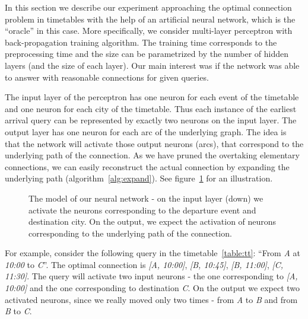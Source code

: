 In this section we describe our experiment approaching the optimal connection problem in timetables with the help of an artificial neural network, which is the ``oracle'' in this case. More specifically, we consider multi-layer perceptron with back-propagation training algorithm. The training time corresponds to the preprocessing time and the size can be parametrized by the number of hidden layers (and the size of each layer). Our main interest was if the network was able to answer with reasonable connections for given queries.

The input layer of the perceptron has one neuron for each event of the timetable and one neuron for each city of the timetable. Thus each instance of the earliest arrival query can be represented by exactly two neurons on the input layer. The output layer has one neuron for each arc of the underlying graph. The idea is that the network will activate those output neurons (arcs), that correspond to the underlying path of the connection. As we have pruned the overtaking elementary connections, we can easily reconstruct the actual connection by expanding the underlying path (algorithm~\ref{alg:expand}). See figure~\ref{fig:neural} for an illustration. \\
	
	\begin{figure}[h]
		\begin{center}
        \end{center}
		\caption{\label{fig:neural} The model of our neural network - on the input layer (down) we activate the neurons corresponding to the departure event and destination city. On the output, we expect the activation of neurons corresponding to the underlying path of the connection.}
	\end{figure}		
	
\noindent For example, consider the following query in the timetable~\ref{table:tt}: ``From \textit{A} at \textit{10:00} to \textit{C}''. The optimal connection is \textit{[A, 10:00]}, \textit{[B, 10:45]}, \textit{[B, 11:00]}, \textit{[C, 11:30]}. The query will activate two input neurons - the one corresponding to \textit{[A, 10:00]} and the one corresponding to destination \textit{C}. On the output we expect two activated neurons, since we really moved only two times - from \textit{A} to \textit{B} and from \textit{B} to \textit{C}. \\
		
